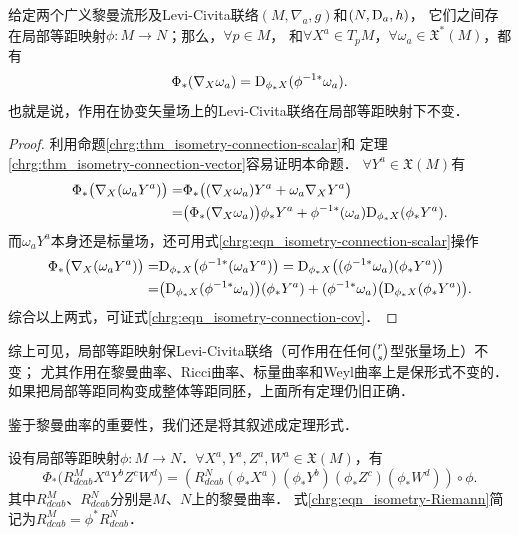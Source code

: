 \begin{proposition}\label{chrg:thm_isometry-connection-cov}
    给定两个广义黎曼流形及Levi-Civita联络$(M,\nabla_a,g)$和$(N,{\rm D}_a,h)$，
    它们之间存在局部等距映射$\phi:M\to N$；那么，$\forall p\in M$，
    和$\forall X^a \in T_{p}M$，$ \forall \omega_a \in \mathfrak{X}^{*}(M)$，都有
    \begin{equation}\label{chrg:eqn_isometry-connection-cov}
    \Phi_{*} (\nabla _X \omega_a) = {\rm D}_ {\phi_* X} ({\phi^{-1*}}\omega_a) .
    \end{equation}
    也就是说，作用在协变矢量场上的Levi-Civita联络在局部等距映射下不变．
\end{proposition}
\begin{proof}
    利用命题\ref{chrg:thm_isometry-connection-scalar}和
    定理\ref{chrg:thm_isometry-connection-vector}容易证明本命题．
    $\forall Y^a \in \mathfrak{X}(M)$有
    \begin{align*}
        \Phi_{*} \bigl(\nabla _X (\omega_a Y^a) \bigr) =&
        \Phi_{*} \bigl((\nabla _X \omega_a )Y^a + \omega_a \nabla _X  Y^a\bigr) \\
        =&\bigl(\Phi_{*} (\nabla _X \omega_a ) \bigr)\phi_{*}Y^a
        + \phi^{-1*}(\omega_a) {\rm D} _{\phi_* X}  (\phi_* Y^a) .
    \end{align*}
    而$\omega_a Y^a$本身还是标量场，还可用式\eqref{chrg:eqn_isometry-connection-scalar}操作
    \begin{align*}
       \Phi_{*} \bigl(\nabla _X (\omega_a Y^a) \bigr) =&  {\rm D}_ {\phi_* X} \bigl({\phi^{-1*}} (\omega_a Y^a)\bigr)
       ={\rm D}_ {\phi_* X} \bigl((\phi^{-1*}\omega_a ) (\phi_{*}Y^a)\bigr) \\
       =&\bigl( {\rm D}_ {\phi_* X} (\phi^{-1*}\omega_a ) \bigr) (\phi_{*}Y^a)
       +(\phi^{-1*}\omega_a ) \bigl({\rm D}_ {\phi_* X}  (\phi_{*}Y^a)\bigr) .
    \end{align*}
    综合以上两式，可证式\eqref{chrg:eqn_isometry-connection-cov}．
\end{proof}
综上可见，局部等距映射保Levi-Civita联络（可作用在任何$\binom{r}{s}$型张量场上）不变；
尤其作用在黎曼曲率、Ricci曲率、标量曲率和Weyl曲率上是保形式不变的．
如果把{\kaishu 局部等距同构}变成整体{\kaishu 等距同胚}，上面所有定理仍旧正确．

鉴于黎曼曲率的重要性，我们还是将其叙述成定理形式．
\begin{theorem}\label{chrg:thm_isometry-Riemann}
    设有局部等距映射$\phi:M\to N$．$\forall X^a,Y^a,Z^a,W^a\in \mathfrak{X}(M)$，有
    \begin{equation}\label{chrg:eqn_isometry-Riemann}
        \Phi_{*}\bigl(R_{dcab}^M X^a Y^b Z^c W^d\bigr) = \left(R^N_{dcab}
        (\phi_{*} X^a) (\phi_{*} Y^b) (\phi_{*} Z^c) (\phi_{*} W^d)\right)\circ \phi .
    \end{equation}
    其中$R_{dcab}^M$、$R_{dcab}^N$分别是$M$、$N$上的黎曼曲率．
    式\eqref{chrg:eqn_isometry-Riemann}简记为$R_{dcab}^M=\phi^* R_{dcab}^N$．
\end{theorem}


